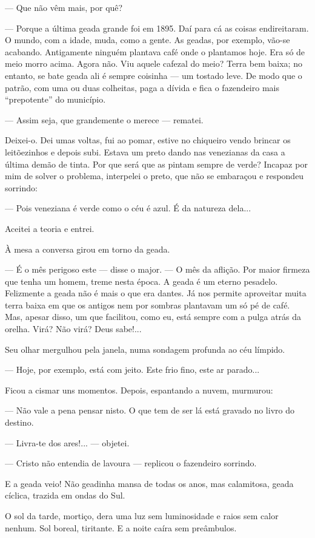 --- Que não vêm mais, por quê?

--- Porque a última geada grande foi em 1895. Daí para cá as coisas
endireitaram. O mundo, com a idade, muda, como a gente. As geadas, por
exemplo, vão-se acabando. Antigamente ninguém plantava café onde o
plantamos hoje. Era só de meio morro acima. Agora não. Viu aquele
cafezal do meio? Terra bem baixa; no entanto, se bate geada ali é sempre
coisinha --- um tostado leve. De modo que o patrão, com uma ou duas
colheitas, paga a dívida e fica o fazendeiro mais ``prepotente'' do
município.

--- Assim seja, que grandemente o merece --- rematei.

Deixei-o. Dei umas voltas, fui ao pomar, estive no chiqueiro vendo
brincar os leitõezinhos e depois subi. Estava um preto dando nas
venezianas da casa a última demão de tinta. Por que será que as pintam
sempre de verde? Incapaz por mim de solver o problema, interpelei o
preto, que não se embaraçou e respondeu sorrindo:

--- Pois veneziana é verde como o céu é azul. É da natureza dela...

Aceitei a teoria e entrei.

À mesa a conversa girou em torno da geada.

--- É o mês perigoso este --- disse o major. --- O mês da aflição. Por
maior firmeza que tenha um homem, treme nesta época. A geada é um eterno
pesadelo. Felizmente a geada não é mais o que era dantes. Já nos permite
aproveitar muita terra baixa em que os antigos nem por sombras plantavam
um só pé de café. Mas, apesar disso, um que facilitou, como eu, está
sempre com a pulga atrás da orelha. Virá? Não virá? Deus sabe!...

Seu olhar mergulhou pela janela, numa sondagem profunda ao céu límpido.

--- Hoje, por exemplo, está com jeito. Este frio fino, este ar parado...

Ficou a cismar uns momentos. Depois, espantando a nuvem, murmurou:

--- Não vale a pena pensar nisto. O que tem de ser lá está gravado no
livro do destino.

--- Livra-te dos ares!... --- objetei.

--- Cristo não entendia de lavoura --- replicou o fazendeiro sorrindo.

E a geada veio! Não geadinha mansa de todas os anos, mas calamitosa,
geada cíclica, trazida em ondas do Sul.

O sol da tarde, mortiço, dera uma luz sem luminosidade e raios sem calor
nenhum. Sol boreal, tiritante. E a noite caíra sem preâmbulos.

